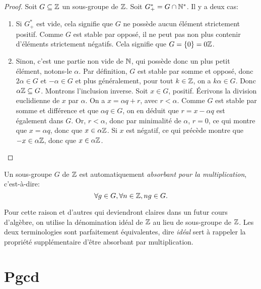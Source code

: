 \begin{proof}
Soit $G \subseteq \mathbb{Z}$ un sous-groupe de $\mathbb{Z}$. Soit $G^*_+ = G \cap \mathbb{N}^*$. Il y a deux cas:
\begin{enumerate}
\item Si $G^*_+$ est vide, cela signifie que $G$ ne possède aucun élément strictement positif. Comme $G$ est stable par opposé, il ne peut pas non plus contenir d'éléments strictement négatifs. Cela signifie que $G=\{0\} = 0\mathbb{Z}$.
\item Sinon, c'est une partie non vide de $\mathbb{N}$, qui possède donc un plus petit élément, notons-le $\alpha$.
Par définition, $G$ est stable par somme et opposé, donc $2\alpha\in G$ et $-\alpha \in G$ et plus généralement, pour tout $k\in \mathbb{Z}$, on a $k\alpha \in G$.
Donc $\alpha\mathbb{Z} \subseteq G$. Montrons l'inclusion inverse.
Soit $x\in G$, positif. \'Ecrivons la division euclidienne de $x$ par $\alpha$. On a $x = \alpha q + r$, avec $r<\alpha$. Comme $G$ est stable par somme et différence et que $\alpha q \in G$, on en déduit que $r = x-\alpha q$ est également dans $G$. Or, $r<\alpha$, donc par minimalité de $\alpha$, $r=0$, ce qui montre que $x = \alpha q$, donc que $x\in \alpha\mathbb{Z}$.
Si $x$ est négatif, ce qui précède montre que $-x\in \alpha\mathbb{Z}$, donc que $x\in \alpha\mathbb{Z}$.
\end{enumerate}
\end{proof}

\begin{proposition} Un sous-groupe $G$ de $\mathbb{Z}$ est automatiquement \emph{absorbant pour la multiplication}, c'est-à-dire:
\[ \forall g\in G, \forall n\in \mathbb{Z}, ng \in G.\]
\end{proposition}

Pour cette raison et d'autres qui deviendront claires dans un futur cours d'algèbre, on utilise la dénomination \og idéal de $\mathbb{Z}$\fg{} au lieu de \og sous-groupe de $\mathbb{Z}$\fg{}. Les deux terminologies sont parfaitement équivalentes, dire \emph{idéal} sert à rappeler la propriété supplémentaire d'être absorbant par multiplication.

\section{Pgcd}

